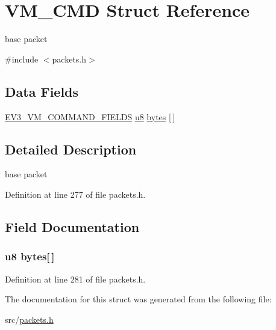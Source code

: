 \hypertarget{struct_v_m___c_m_d}{}\section{V\+M\+\_\+\+C\+M\+D Struct Reference}
\label{struct_v_m___c_m_d}


base packet  




{\ttfamily \#include $<$packets.\+h$>$}

\subsection*{Data Fields}
\begin{DoxyCompactItemize}
\item 
\hyperlink{packets_8h_a4c98eb40db8c22149f549465d1186e0d}{E\+V3\+\_\+\+V\+M\+\_\+\+C\+O\+M\+M\+A\+N\+D\+\_\+\+F\+I\+E\+L\+D\+S} \hyperlink{defs_8h_a92c50087ca0e64fa93fc59402c55f8ca}{u8} \hyperlink{struct_v_m___c_m_d_a8e19d282af2481cb27f08a7de26a8e6a}{bytes} \mbox{[}$\,$\mbox{]}
\end{DoxyCompactItemize}


\subsection{Detailed Description}
base packet 

Definition at line 277 of file packets.\+h.



\subsection{Field Documentation}
\hypertarget{struct_v_m___c_m_d_a8e19d282af2481cb27f08a7de26a8e6a}{}
\subsubsection[{bytes}]{ {\bf u8} bytes\mbox{[}$\,$\mbox{]}}\label{struct_v_m___c_m_d_a8e19d282af2481cb27f08a7de26a8e6a}


Definition at line 281 of file packets.\+h.



The documentation for this struct was generated from the following file\+:\begin{DoxyCompactItemize}
\item 
src/\hyperlink{packets_8h}{packets.\+h}\end{DoxyCompactItemize}
